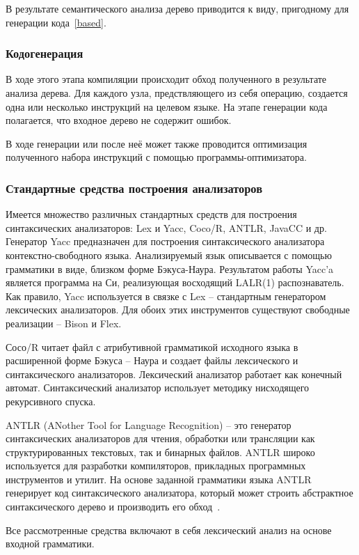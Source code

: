 В результате семантического анализа дерево приводится к виду, пригодному для генерации кода~\ref{based}.

\subsubsection{Кодогенерация}\label{subsubsec:codegen}
В ходе этого этапа компиляции происходит обход полученного в результате анализа дерева.
Для каждого узла, предствляющего из себя операцию, создается одна или несколько инструкций на целевом языке.
На этапе генерации кода полагается, что входное дерево не содержит ошибок.

В ходе генерации или после неё может также проводится оптимизация полученного набора инструкций с помощью программы-оптимизатора.

\subsubsection{Стандартные средства построения анализаторов}\label{subsubsec:std}
Имеется множество различных стандартных средств для построения синтаксических анализаторов: Lex и Yacc, Coco/R, ANTLR, JavaCC и др.
Генератор Yacc предназначен для построения синтаксического анализатора контекстно-свободного языка.
Анализируемый язык описывается с помощью грамматики в виде, близком форме Бэкуса-Наура.
Результатом работы Yacc'a является программа на Си, реализующая восходящий LALR(1) распознаватель.
Как правило, Yacc используется в связке с Lex – стандартным генератором лексических анализаторов.
Для обоих этих инструментов существуют свободные реализации – Bison и Flex.

Сосо/R читает файл с атрибутивной грамматикой исходного языка в расширенной форме Бэкуса – Наура и создает файлы
лексического и синтаксического анализаторов.
Лексический анализатор работает как конечный автомат.
Синтаксический анализатор использует методику нисходящего рекурсивного спуска.

ANTLR (ANother Tool for Language Recognition) – это генератор синтаксических анализаторов для чтения, обработки или
трансляции как структурированных текстовых, так и бинарных файлов.
ANTLR широко используется для разработки компиляторов, прикладных программных инструментов и утилит.
На основе заданной грамматики языка ANTLR генерирует код синтаксического анализатора, который может строить
абстрактное синтаксического дерево и производить его обход~\cite{antlr}.

Все рассмотренные средства включают в себя лексический анализ на основе входной грамматики.

